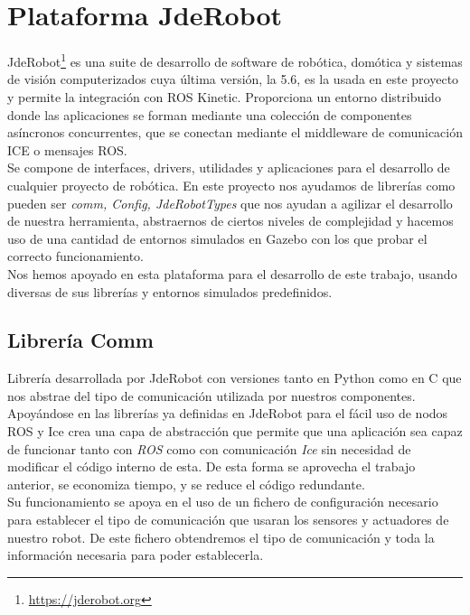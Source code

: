 \section{Plataforma JdeRobot}
\label{sec:jderobot}
JdeRobot\footnote{\url{https://jderobot.org}} es una suite de desarrollo de software de robótica, domótica y sistemas de
visión computerizados cuya última versión, la 5.6, es la usada en este proyecto y permite la integración con ROS Kinetic. Proporciona un entorno distribuido donde las aplicaciones se forman mediante una colección de componentes asíncronos concurrentes, que se conectan mediante el middleware de comunicación ICE o mensajes ROS.\\

Se compone de interfaces, drivers, utilidades y aplicaciones para el desarrollo de cualquier proyecto de robótica. En este proyecto nos ayudamos de librerías como pueden ser \textit{comm, Config, JdeRobotTypes} que nos ayudan a agilizar el desarrollo de nuestra herramienta, abstraernos de ciertos niveles de complejidad y hacemos uso de una cantidad de entornos simulados en Gazebo con los que probar el correcto funcionamiento.\\

Nos hemos apoyado en esta plataforma para el desarrollo de este trabajo, usando diversas de sus librerías y entornos simulados predefinidos.


\subsection{Librería Comm}
\label{sec:libreria-com}
Librería desarrollada por JdeRobot con versiones tanto en Python como en C que nos abstrae del tipo de comunicación utilizada por nuestros componentes. Apoyándose en las librerías ya definidas en JdeRobot para el fácil uso de nodos ROS y Ice crea una capa de abstracción que permite que una aplicación sea capaz de funcionar tanto con \textit{ROS} como con comunicación \textit{Ice} sin necesidad de modificar el código interno de esta. De esta forma se aprovecha el trabajo anterior, se economiza tiempo, y se reduce el código redundante.\\

Su funcionamiento se apoya en el uso de un fichero de configuración necesario para establecer el tipo de comunicación que usaran los sensores y actuadores de nuestro robot. De este fichero obtendremos el tipo de comunicación y toda la información necesaria para poder establecerla. \\

